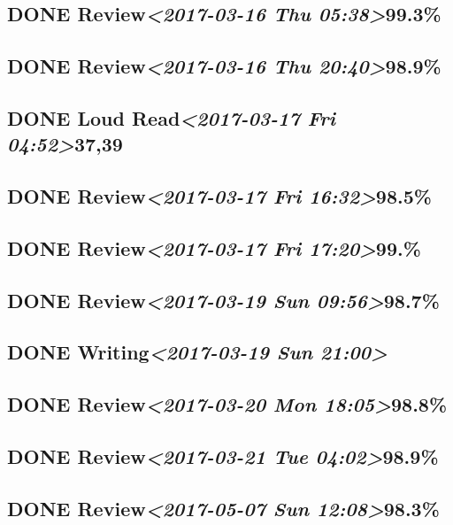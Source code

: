 \documentclass[11pt]{ctexart}
\begin{document}
\subsection{{\bfseries\sffamily DONE} Review\textit{<2017-03-16 Thu 05:38>}99.3\%}
\label{sec:org5b0e88d}
\subsection{{\bfseries\sffamily DONE} Review\textit{<2017-03-16 Thu 20:40>}98.9\%}
\label{sec:org0cebfb8}
\subsection{{\bfseries\sffamily DONE} Loud Read\textit{<2017-03-17 Fri 04:52>}37,39}
\label{sec:org5b597db}
\subsection{{\bfseries\sffamily DONE} Review\textit{<2017-03-17 Fri 16:32>}98.5\%}
\label{sec:org55623a7}
\subsection{{\bfseries\sffamily DONE} Review\textit{<2017-03-17 Fri 17:20>}99.\%}
\label{sec:org1de2117}
\subsection{{\bfseries\sffamily DONE} Review\textit{<2017-03-19 Sun 09:56>}98.7\%}
\label{sec:orge187ec2}
\subsection{{\bfseries\sffamily DONE} Writing\textit{<2017-03-19 Sun 21:00>}}
\label{sec:org9471f89}
\subsection{{\bfseries\sffamily DONE} Review\textit{<2017-03-20 Mon 18:05>}98.8\%}
\label{sec:orgf407dee}
\subsection{{\bfseries\sffamily DONE} Review\textit{<2017-03-21 Tue 04:02>}98.9\%}
\label{sec:org25bb985}
\subsection{{\bfseries\sffamily DONE} Review\textit{<2017-05-07 Sun 12:08>}98.3\%}
\label{sec:org1def0b7}
\end{document}
